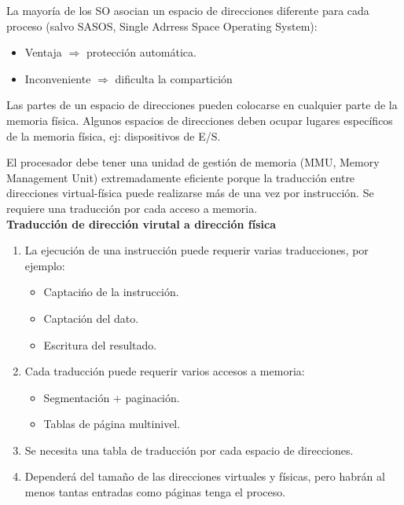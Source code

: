 \documentclass{article}
\begin{document}
La mayoría de los SO asocian un espacio de direcciones diferente para cada proceso (salvo SASOS, Single Adrress Space Operating System):
\begin{itemize}
\item Ventaja $\Rightarrow$ protección automática.

\item Inconveniente $\Rightarrow$ dificulta la compartición
\end{itemize}

Las partes de un espacio de direcciones pueden colocarse en cualquier parte de la memoria física. Algunos espacios de direcciones deben ocupar lugares específicos de la memoria física, ej: dispositivos de E/S.

El procesador debe tener una unidad de gestión de memoria (MMU, Memory Management Unit) extremadamente eficiente porque la traducción entre direcciones virtual-física puede realizarse más de una vez por instrucción. Se requiere una traducción por cada acceso a memoria.\\

\textbf{Traducción de dirección virutal a dirección física}
\begin{enumerate}
\item La ejecución de una instrucción puede requerir varias traducciones, por ejemplo:
	\begin{itemize}
	\item Captacińo de la instrucción.
	
	\item Captación del dato.
	
	\item Escritura del resultado.
	\end{itemize}
	
\item Cada traducción puede requerir varios accesos a memoria:
	\begin{itemize}
	\item Segmentación + paginación.
	
	\item Tablas de página multinivel.
	\end{itemize}
	
\item Se necesita una tabla de traducción por cada espacio de direcciones.

\item Dependerá del tamaño de las direcciones virtuales y físicas, pero habrán al menos tantas entradas como páginas tenga el proceso.
\end{enumerate}
\end{document}
